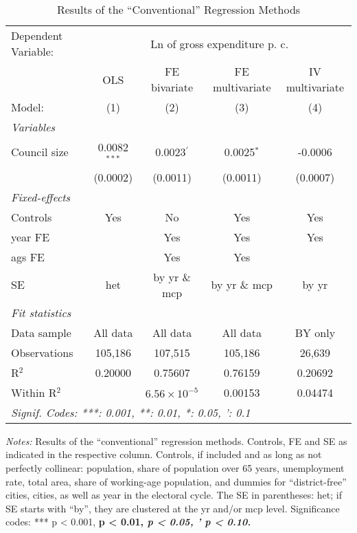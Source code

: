 
\begin{table}[htbp]
   \caption{\label{tab:conv_results} Results of the ``Conventional'' Regression Methods}
   \centering
   \begin{tabular}{lcccc}
      \tabularnewline \midrule \midrule
      Dependent Variable: & \multicolumn{4}{c}{Ln of gross expenditure p. c.}\\
                    & \acs{OLS}      & \acs{FE} bivariate    & \acs{FE} multivariate  & \acs{IV} multivariate \\    
      Model:        & (1)            & (2)                   & (3)                    & (4)\\  
      \midrule
      \emph{Variables}\\
      Council size  & 0.0082$^{***}$ & 0.0023$^{'}$          & 0.0025$^{*}$           & -0.0006\\   
                    & (0.0002)       & (0.0011)              & (0.0011)               & (0.0007)\\   
      \midrule
      \emph{Fixed-effects}\\
      Controls      & Yes            & No                    & Yes                    & Yes\\  
      year \ac{FE}  &                & Yes                   & Yes                    & Yes\\  
      ags \ac{FE}   &                & Yes                   & Yes                    & \\  
      \acs{SE} & \acs{het} & by \acs{yr} \& \acs{mcp} & by \acs{yr} \& \acs{mcp} & by \acs{yr}\\
      \midrule
      \emph{Fit statistics}\\
      Data sample   & All data       & All data              & All data               & \acs{BY} only\\   
      Observations  & 105,186        & 107,515               & 105,186                & 26,639\\  
      R$^2$         & 0.20000        & 0.75607               & 0.76159                & 0.20692\\  
      Within R$^2$  &                & $6.56\times 10^{-5}$  & 0.00153                & 0.04474\\  
      \midrule \midrule
      \multicolumn{5}{l}{\emph{Signif. Codes: ***: 0.001, **: 0.01, *: 0.05, ': 0.1}}\\
   \end{tabular}
   
   \par \raggedright 
   \footnotesize{\textit{Notes:} Results of the ``conventional'' regression methods. Controls, \ac{FE} and \ac{SE} as indicated in the respective column. Controls, if included and as long as not perfectly collinear: population, share of population over 65 years, unemployment rate, total area, share of working-age population, and dummies for ``district-free'' cities, cities, as well as year in the electoral cycle. The \acl{SE} in parentheses: \ac{het}; if \ac{SE} starts with ``by'', they are clustered at the \ac{yr} and/or \ac{mcp} level. Significance codes: *** p < 0.001, \textbf{ p < 0.01, \textit{ p < 0.05, ' p < 0.10.}}}
\end{table}


